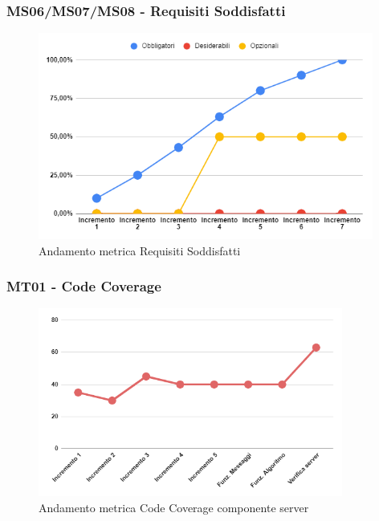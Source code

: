 \subsubsection{MS06/MS07/MS08 - Requisiti Soddisfatti}
\begin{figure}[H]
	\centering
	\includegraphics[width=11cm]{images/requisiti_soddisfatti.png}
	\caption{Andamento metrica Requisiti Soddisfatti}
\end{figure}

\subsubsection{MT01 - Code Coverage}

\begin{figure}[H]
	\centering
	\includegraphics[width=10cm]{images/metricheServer/code_coverage.png}
	\caption{Andamento metrica Code Coverage componente server}
\end{figure}


